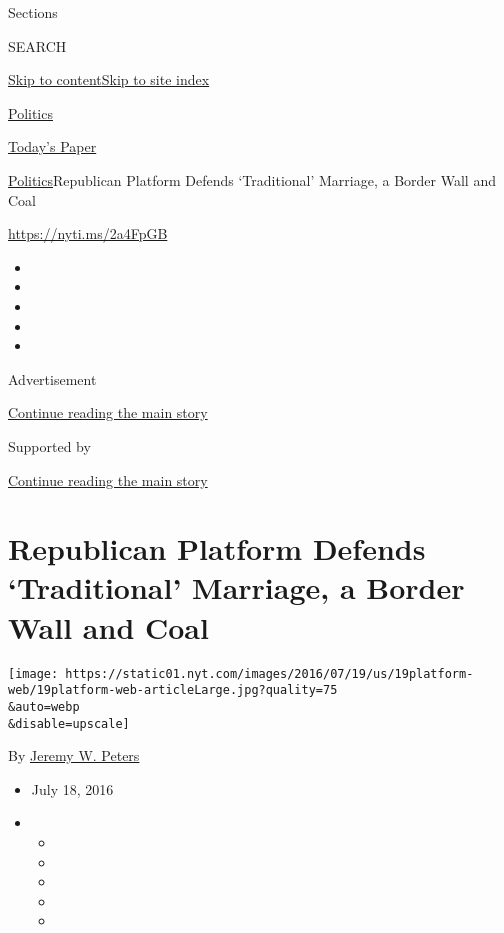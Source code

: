 Sections

SEARCH

\protect\hyperlink{site-content}{Skip to
content}\protect\hyperlink{site-index}{Skip to site index}

\href{https://www.nytimes.com/section/politics}{Politics}

\href{https://myaccount.nytimes.com/auth/login?response_type=cookie\&client_id=vi}{}

\href{https://www.nytimes.com/section/todayspaper}{Today's Paper}

\href{/section/politics}{Politics}\textbar{}Republican Platform Defends
`Traditional' Marriage, a Border Wall and Coal

\url{https://nyti.ms/2a4FpGB}

\begin{itemize}
\item
\item
\item
\item
\item
\end{itemize}

Advertisement

\protect\hyperlink{after-top}{Continue reading the main story}

Supported by

\protect\hyperlink{after-sponsor}{Continue reading the main story}

\hypertarget{republican-platform-defends-traditional-marriage-a-border-wall-and-coal}{%
\section{Republican Platform Defends `Traditional' Marriage, a Border
Wall and
Coal}\label{republican-platform-defends-traditional-marriage-a-border-wall-and-coal}}

\texttt{[image: https://static01.nyt.com/images/2016/07/19/us/19platform-web/19platform-web-articleLarge.jpg?quality=75\\\&auto=webp\\\&disable=upscale]}

By \href{http://www.nytimes.com/by/jeremy-w-peters}{Jeremy W. Peters}

\begin{itemize}
\item
  July 18, 2016
\item
  \begin{itemize}
  \item
  \item
  \item
  \item
  \item
  \end{itemize}
\end{itemize}

